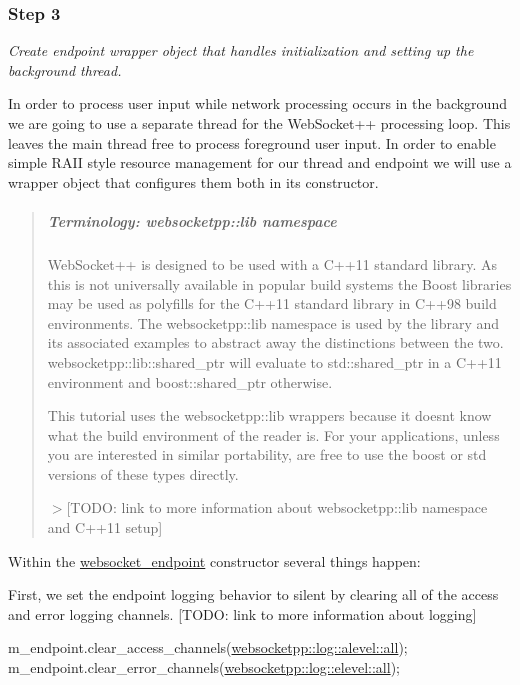 \subsubsection*{Step 3}

{\itshape Create endpoint wrapper object that handles initialization and setting up the background thread.}

In order to process user input while network processing occurs in the background we are going to use a separate thread for the Web\+Socket++ processing loop. This leaves the main thread free to process foreground user input. In order to enable simple R\+A\+II style resource management for our thread and endpoint we will use a wrapper object that configures them both in its constructor.

\begin{quote}
\subparagraph*{Terminology\+: websocketpp\+::lib namespace}

Web\+Socket++ is designed to be used with a C++11 standard library. As this is not universally available in popular build systems the Boost libraries may be used as polyfills for the C++11 standard library in C++98 build environments. The {\ttfamily websocketpp\+::lib} namespace is used by the library and its associated examples to abstract away the distinctions between the two. {\ttfamily websocketpp\+::lib\+::shared\+\_\+ptr} will evaluate to {\ttfamily std\+::shared\+\_\+ptr} in a C++11 environment and {\ttfamily boost\+::shared\+\_\+ptr} otherwise.

This tutorial uses the {\ttfamily websocketpp\+::lib} wrappers because it doesn\textquotesingle{}t know what the build environment of the reader is. For your applications, unless you are interested in similar portability, are free to use the boost or std versions of these types directly.

$>$\mbox{[}T\+O\+DO\+: link to more information about websocketpp\+::lib namespace and C++11 setup\mbox{]} \end{quote}


Within the {\ttfamily \mbox{\hyperlink{classwebsocket__endpoint}{websocket\+\_\+endpoint}}} constructor several things happen\+:

First, we set the endpoint logging behavior to silent by clearing all of the access and error logging channels. \mbox{[}T\+O\+DO\+: link to more information about logging\mbox{]} 
\begin{DoxyCode}
m\_endpoint.clear\_access\_channels(\mbox{\hyperlink{structwebsocketpp_1_1log_1_1alevel_a853aa0b8976e53f3181af3bc398d493e}{websocketpp::log::alevel::all}});
m\_endpoint.clear\_error\_channels(\mbox{\hyperlink{structwebsocketpp_1_1log_1_1elevel_a9b31ff708c221d314f9f4eb3ff2b1ad7}{websocketpp::log::elevel::all}});
\end{DoxyCode}


